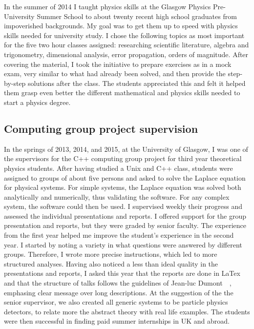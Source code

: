 \documentclass[12pt]{article} %
\begin{document}
In the summer of 2014 I taught physics skills at the Glasgow Physics Pre-University Summer School to about twenty recent high school graduates from impoverished backgrounds. My goal was to get them up to speed with physics skills needed for university study. I chose the following topics as most important for the five two hour classes assigned: researching scientific literature, algebra and trigonometry, dimensional analysis, error propagation, orders of magnitude. After covering the material, I took the initiative to prepare exercises as in a mock exam, very similar to what had already been solved, and then provide the step-by-step solutions after the class. The students appreciated this and felt it helped them grasp even better the different mathematical and physics skills needed to start a physics degree. 


\subsection{Computing group project supervision}

In the springs of 2013, 2014, and 2015, at the University of Glasgow, I was one of the supervisors for the C++ computing group project for third year theoretical physics students. After having studied a Unix and C++ class, students were assigned to groups of about five persons and asked to solve the Laplace equation for physical systems. For simple systems, the Laplace equation was solved both analytically and numerically, thus validating the software. For any complex system, the software could then be used. I supervised weekly their progress and assessed the individual presentations and reports. I offered support for the group presentation and reports, but they were graded by senior faculty. The experience from the first year helped me improve the student's experience in the second year. I started by noting a variety in what questions were answered by different groups. Therefore, I wrote more precise instructions, which led to more structured analyses. Having also noticed a less than ideal quality in the presentations and reports, I asked this year that the reports are done in LaTex and that the structure of talks follows the guidelines of Jean-luc Dumont~\cite{JeanLucDumontVideo}~\cite{JeanLucDumontBook}, emphasing clear message over long descriptions. At the suggestion of the the senior supervisor, we also created all generic systems to be particle physics detectors, to relate more the abstract theory with real life examples. The students were then successful in finding paid summer internships in UK and abroad. 
\end{document}
